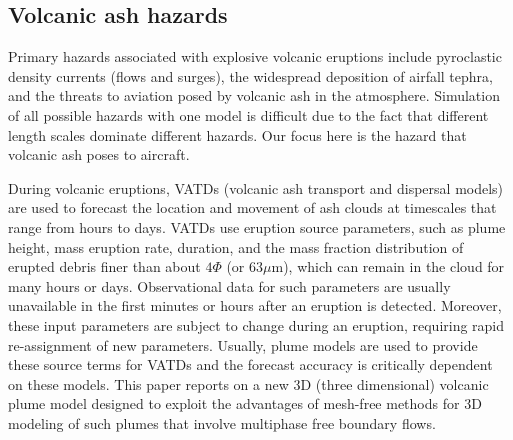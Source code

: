 \documentclass[journal abbreviation, manuscript]{copernicus}
\begin{document}
\introduction  %
\subsection{Volcanic ash hazards}
Primary hazards associated with explosive volcanic eruptions include pyroclastic density currents (flows and surges), the widespread deposition of airfall tephra, and the threats to aviation posed by volcanic ash in the atmosphere.
Simulation of all possible hazards with one model is difficult due to the fact that different length scales dominate different hazards. Our focus here is the hazard that volcanic ash poses to aircraft. 

During volcanic eruptions, VATDs (volcanic ash transport and dispersal models) are used to forecast the location and movement of ash clouds at timescales that range from hours to days. VATDs use eruption source parameters, such as plume height, mass eruption rate, duration, and the mass fraction distribution of erupted debris finer than about $4 \Phi$ (or $63  \mu$m), which can remain in the cloud for many hours or days. Observational data for such parameters are usually unavailable in the first minutes or hours after an eruption is detected. Moreover, these input parameters are subject to change during an eruption, requiring rapid re-assignment of new parameters. Usually, plume models are used to provide these source terms for VATDs and the forecast accuracy is critically dependent on these models. This paper reports on a new 3D (three dimensional) volcanic plume model designed to exploit the advantages of mesh-free methods for 3D modeling of such plumes that involve multiphase free boundary flows.

\end{document}
